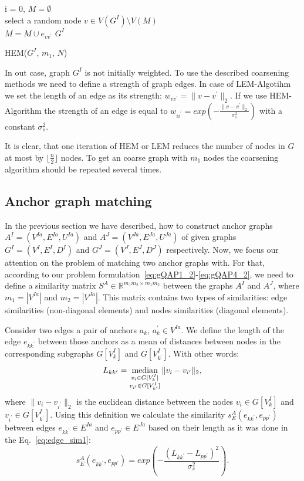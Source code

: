{\LinesNumberedHidden
\begin{algorithm}[h]
	i = 0, $M=\emptyset$ \\
	{ select a random node $v\in V(G^I)\setminus V(M)$ \\
	  {$M=M\cup{e_{vv^\prime}}$}
	}
	\Return $G^I$
	\caption{HEM($G^I$, $m_1$, $N$)} \label{alg:HEM}
\end{algorithm} }

In out case, graph $G^I$ is not initially weighted. To use the described coarsening methods we need to define a strength of graph edges. In case of LEM-Algotihm we set the length of an edge as its strength: $w_{vv^\prime}=\|v-v^\prime\|_{2}$. If we use HEM-Algorithm the strength of an edge is equal to $w_{ii^\prime} = exp(-\frac{\|v-v^\prime\|_{2}}{\sigma^2_{s}})$ with a constant $\sigma^2_{s}$.

It is clear, that one iteration of HEM or LEM reduces the number of nodes in $G$ at most by $\lfloor\frac{n}{2} \rfloor$ nodes. To get an coarse graph with $m_1$ nodes the coarsening algorithm should be repeated several times.

\subsection{Anchor graph matching}
In the previous section we have described, how to construct anchor graphs $A^I=(V^{Ia},E^{Ia}, U^{Ia})$ and $A^J=(V^{Ja},E^{Ja},U^{Ja})$ of given graphs $G^I = (V^I, E^I, D^I)$ and $G^J=(V^J, E^J, D^J)$ respectively. Now, we focus our attention on the problem of matching two anchor graphs with. For that, according to our problem formulation~\eqref{eq:gQAP1_2}-\eqref{eq:gQAP4_2}, we need to define a similarity matrix $S^A\in\mathbb{R}^{m_1m_2\times m_1m_2}$ between the graphs $A^I$ and $A^J$, where $m_1=|V^{Ia}|$ and $m_2=|V^{Ja}|$. This matrix contains two types of similarities: edge similarities (non-diagonal elements) and nodes similarities (diagonal elements).

Consider two edges a pair of anchors  $a_k$, $a_k^\prime\in V^{Ia}$. We define the length of the edge $e_{kk^{\prime}}$ between those anchors as a mean of distances between nodes in the corresponding subgraphs $G[V^I_k]$ and $G[V^I_{k^\prime}]$. With other words:
\begin{equation} L_{kk^\prime} = \mathop{\rm median}_{\substack{v_i\in G[V^I_k]\\ v_{i^\prime}\in G[V^I_{k^\prime}]} }\|v_i-v_{i^\prime}\|_{2}, \end{equation}
where $\|v_i-v_{i^\prime}\|_{2}$ is the euclidean distance between the nodes $v_i\in G[V^I_k]$ and $v_{i^\prime}\in G[V^I_{k^\prime}]$.
Using this definition we calculate the similarity $s^A_E(e_{kk^\prime}, e_{pp^\prime})$ between edges $e_{kk^\prime}\in E^{Ia}$ and $e_{pp^\prime}\in E^{Ja}$ based on their length as it was done in the Eq.~\eqref{eq:edge_sim1}:
\begin{equation*}
s^A_E(e_{kk^\prime}, e_{pp^\prime}) = exp(-\frac{(L_{kk^\prime} - L_{pp^\prime})^2}{\sigma^2_{s}}).
\label{eq:s_e_A}
\end{equation*}

